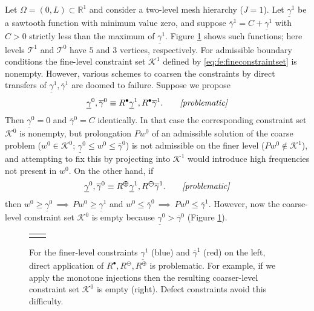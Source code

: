 \documentclass[review,hidelinks,onefignum,onetabnum]{siamart220329}
\newcommand{\RR}{\mathbb{R}}
\newcommand{\maxR}{R^{\bm{\oplus}}}
\newcommand{\minR}{R^{\bm{\ominus}}}
\newcommand{\iR}{R^{\bullet}}
\begin{document}
\begin{example}  \label{ex:directRbad}  
Let $\Omega = (0,L) \subset \RR^1$ and consider a two-level mesh hierarchy ($J=1$).  Let $\underline{\gamma}^1$ be a sawtooth function with minimum value zero, and suppose $\overline{\gamma}^1=C+\underline{\gamma}^1$ with $C>0$ strictly less than the maximum of $\underline{\gamma}^1$.  Figure \ref{fig:directRbad} shows such functions; here levels $\mathcal{T}^1$ and $\mathcal{T}^0$ have $5$ and $3$ vertices, respectively.  For admissible boundary conditions the fine-level constraint set $\mathcal{K}^1$ defined by \eqref{eq:fe:fineconstraintset} is nonempty.  However, various schemes to coarsen the constraints by direct transfers of $\underline{\gamma}^1,\overline{\gamma}^1$ are doomed to failure.  Suppose we propose
\begin{equation}
    \label{eq:fe:badstandard}
    \underline{\gamma}^0, \overline{\gamma}^0 \equiv \iR \underline{\gamma}^1, \iR \overline{\gamma}^1. \qquad \text{\emph{[problematic]}}
\end{equation}
Then $\underline{\gamma}^0=0$ and $\overline{\gamma}^0=C$ identically.  In that case the corresponding constraint set $\mathcal{K}^0$ is nonempty, but prolongation $Pw^0$ of an admissible solution of the coarse problem ($w^0\in\mathcal{K}^0$; $\underline{\gamma}^0 \le w^0 \le \overline{\gamma}^0$) is not admissible on the finer level ($Pw^0 \notin \mathcal{K}^1$), and attempting to fix this by projecting into $\mathcal{K}^1$ would introduce high frequencies not present in $w^0$.  On the other hand, if
\begin{equation}
    \label{eq:fe:badmonotone}
    \underline{\gamma}^0, \overline{\gamma}^0 \equiv \maxR \underline{\gamma}^1, \minR \overline{\gamma}^1. \qquad \text{\emph{[problematic]}}
\end{equation}
then $w^0 \ge \underline{\gamma}^0 \, \implies \, Pw^0 \ge \underline{\gamma}^1$ and $w^0 \le \overline{\gamma}^0 \, \implies \, Pw^0 \le \overline{\gamma}^1$.  However, now the coarse-level constraint set $\mathcal{K}^0$ is empty because $\underline{\gamma}^0 > \overline{\gamma}^0$ (Figure \ref{fig:directRbad}).
\end{example}

\begin{figure}[ht]
\centering
\begin{tabular}{cc}

&

\end{tabular}
\caption{For the finer-level constraints $\underline{\gamma}^1$ (blue) and $\overline{\gamma}^1$ (red) on the left, direct application of $\iR,\minR,\maxR$ is problematic.  For example, if we apply the monotone injections then the resulting coarser-level constraint set $\mathcal{K}^0$ is empty (right).  Defect constraints avoid this difficulty.}
\label{fig:directRbad}
\end{figure}
\end{document}
